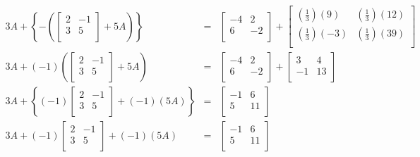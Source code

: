\documentclass{ximera}
\begin{document}
\begin{example}
\[\begin{array}{rcl}
3A + \left\{-\left(\left[ \begin{array}{rr} 2 & -1 \\ 3 & 5 \\ \end{array}\right] + 5A \right)\right\} & = & \left[ \begin{array}{rr} -4 & 2 \\ 6 & -2 \\ \end{array}\right] +  \left[ \begin{array}{rr} \left(\frac{1}{3}\right)(9) & \left(\frac{1}{3}\right)(12) \\[2pt] \left(\frac{1}{3}\right)(-3) & \left(\frac{1}{3}\right)(39) \\ \end{array}\right]  \\  



3A + (-1)\left(\left[ \begin{array}{rr} 2 & -1 \\ 3 & 5 \\ \end{array}\right] + 5A \right) & = & \left[ \begin{array}{rr} -4 & 2 \\ 6 & -2 \\ \end{array}\right] + \left[ \begin{array}{rr} 3 & 4 \\ -1 & 13 \\ \end{array}\right] \\  



3A + \left\{ (-1)\left[ \begin{array}{rr} 2 & -1 \\ 3 & 5 \\ \end{array}\right] + (-1)(5A)\right \}  & = & \left[ \begin{array}{rr} -1 & 6 \\ 5 & 11 \\ \end{array}\right]  \\  

3A +  (-1)\left[ \begin{array}{rr} 2 & -1 \\ 3 & 5 \\ \end{array}\right] + (-1)(5A)  & = & \left[ \begin{array}{rr} -1 & 6 \\ 5 & 11 \\ \end{array}\right]  \\  


\end{array}\]
\end{example}
\end{document}
